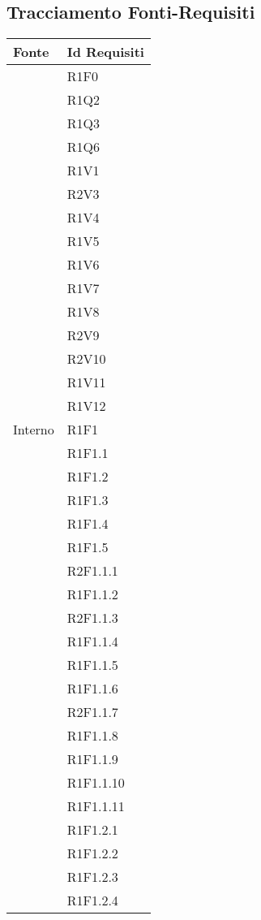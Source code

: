 \subsection{Tracciamento Fonti-Requisiti}
\normalsize
\begin{longtable}{|>{\centering}m{5cm}|m{5cm}<{\centering}|}
\hline 
\textbf{Fonte} & \textbf{Id Requisiti}\\
\hline
\endhead
{Capitolato}&{R1F0}\\
&{R1Q2}\\
&{R1Q3}\\
&{R1Q6}\\
&{R1V1}\\
&{R2V3}\\
&{R1V4}\\
&{R1V5}\\
&{R1V6}\\
&{R1V7}\\
&{R1V8}\\
&{R2V9}\\
&{R2V10}\\
&{R1V11}\\
&{R1V12}\\ \hline
{Interno} & {R1F1}\\
&{R1F1.1}\\
&{R1F1.2}\\
&{R1F1.3}\\
&{R1F1.4}\\
&{R1F1.5}\\
&{R2F1.1.1}\\
&{R1F1.1.2}\\
&{R2F1.1.3}\\
&{R1F1.1.4}\\
&{R1F1.1.5}\\
&{R1F1.1.6}\\
&{R2F1.1.7}\\
&{R1F1.1.8}\\
&{R1F1.1.9}\\
&{R1F1.1.10}\\
&{R1F1.1.11}\\

&{R1F1.2.1}\\
&{R1F1.2.2}\\
&{R1F1.2.3}\\
&{R1F1.2.4}\\


\end{longtable}

